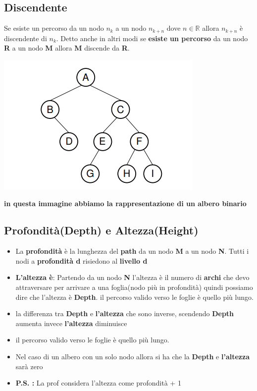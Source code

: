 \subsection{Discendente}
Se esiste un percorso da un nodo $n_k$ a un nodo $n_{k+n}$ dove $n \in \mathbb{R}$  allora $n_{k+n}$ è discendente di $n_k$. \newline
Detto anche in altri modi se \textbf{esiste un percorso} da un nodo \textbf{R} a un nodo \textbf{ M} allora \textbf{M} discende da \textbf{R}.\newline
\begin{center}
    \includegraphics[scale = 0.8]{Capitoli/Alberi Binari/Esempi/Albero.png}
    
\end{center}
\textbf{in questa immagine abbiamo la rappresentazione di un albero binario}
\subsection{Profondità(Depth) e Altezza(Height)}
\begin{itemize}
    \item La \textbf{profondità} è la lunghezza del \textbf{path} da un nodo \textbf{M} a un nodo \textbf{N}. Tutti i nodi a \textbf{profondità d} risiedono al \textbf{livello d}
    \item \textbf{L'altezza è}: Partendo da un nodo \textbf{N} l'altezza è il numero di \textbf{archi} che devo attraversare per arrivare a una foglia(nodo più in profondità) quindi possiamo dire che l'altezza è \textbf{Depth}. il percorso valido verso le foglie è quello più lungo.
    \item la differenza tra \textbf{Depth} e \textbf{l'altezza} che sono inverse, scendendo \textbf{Depth} aumenta invece \textbf{l'altezza} diminuisce 
    \item il percorso valido verso le foglie è quello più lungo.
    \item Nel caso di un albero con un solo nodo allora si ha che la \textbf{Depth} e \textbf{l'altezza} sarà zero
    \item \textbf{P.S. :} La prof considera l'altezza come profondità + 1
\end{itemize}

